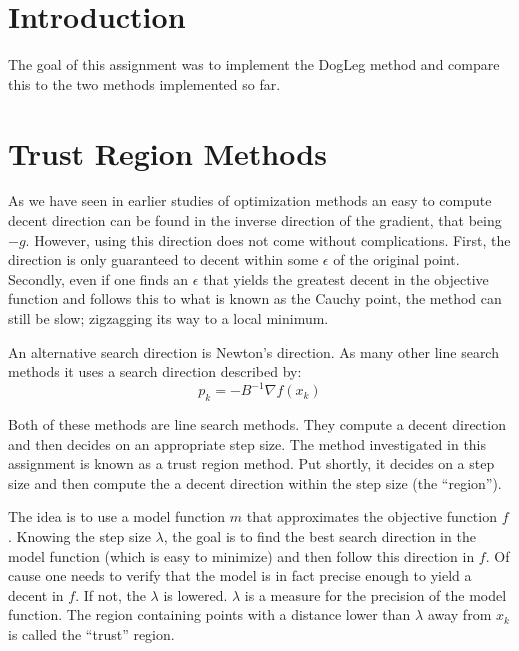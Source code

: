 \documentclass[10pt,oneside,a4paper,final,english]{memoir}
\begin{document}




\maketitle
\newpage

\section{Introduction}
The goal of this assignment was to implement the DogLeg method and
compare this to the two methods implemented so far.

\section{Trust Region Methods}
As we have seen in earlier studies of optimization methods an easy to
compute decent direction can be found in the inverse direction of the
gradient, that being $-g$. However, using this direction does not come
without complications. First, the direction is only guaranteed to
decent within some $\epsilon$ of the original point. Secondly, even if
one finds an $\epsilon$ that yields the greatest decent in the
objective function and follows this to what is known as the Cauchy
point, the method can still be slow; zigzagging its way to a local
minimum.

An alternative search direction is Newton's direction. As many other
line search methods it uses a search direction described by:
\[ p_k = -B^{-1} \nabla f(x_k) \]

Both of these methods are line search methods. They compute a decent
direction and then decides on an appropriate step size. The method
investigated in this assignment is known as a trust region method. Put
shortly, it decides on a step size and then compute the a decent
direction within the step size (the ``region'').

The idea is to use a model function $m$ that approximates the
objective function $f$. Knowing the step size $\lambda$, the goal is
to find the best search direction in the model function (which is easy
to minimize) and then follow this direction in $f$. Of cause one needs
to verify that the model is in fact precise enough to yield a decent
in $f$. If not, the $\lambda$ is lowered. $\lambda$ is a measure for
the precision of the model function. The region containing points with
a distance lower than $\lambda$ away from $x_k$ is called the
``trust'' region.
\end{document}
